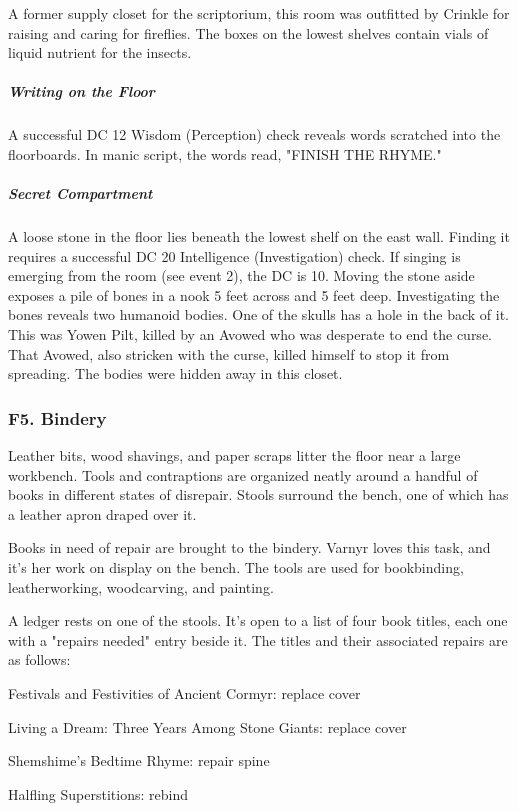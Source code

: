 \documentclass[10pt,a4paper,twoside,bg=print,twocolumn,openany,nodeprecatedcode]{dndbook}
\begin{document}
A former supply closet for the scriptorium, this room was outfitted by Crinkle for raising and caring for fireflies. The boxes on the lowest shelves contain vials of liquid nutrient for the insects.

\subparagraph{Writing on the Floor}
A successful DC 12 Wisdom (Perception) check reveals words scratched into the floorboards. In manic script, the words read, "FINISH THE RHYME."

\subparagraph{Secret Compartment}
A loose stone in the floor lies beneath the lowest shelf on the east wall. Finding it requires a successful DC 20 Intelligence (Investigation) check. If singing is emerging from the room (see event 2), the DC is 10. Moving the stone aside exposes a pile of bones in a nook 5 feet across and 5 feet deep. Investigating the bones reveals two humanoid bodies. One of the skulls has a hole in the back of it. This was Yowen Pilt, killed by an Avowed who was desperate to end the curse. That Avowed, also stricken with the curse, killed himself to stop it from spreading. The bodies were hidden away in this closet.

\subsubsection{F5. Bindery}
\begin{DndReadAloud}{}
Leather bits, wood shavings, and paper scraps litter the floor near a large workbench. Tools and contraptions are organized neatly around a handful of books in different states of disrepair. Stools surround the bench, one of which has a leather apron draped over it.

\end{DndReadAloud}

Books in need of repair are brought to the bindery. Varnyr loves this task, and it's her work on display on the bench. The tools are used for bookbinding, leatherworking, woodcarving, and painting.

A ledger rests on one of the stools. It's open to a list of four book titles, each one with a "repairs needed" entry beside it. The titles and their associated repairs are as follows:

Festivals and Festivities of Ancient Cormyr: replace cover

Living a Dream: Three Years Among Stone Giants: replace cover

Shemshime's Bedtime Rhyme: repair spine

Halfling Superstitions: rebind
\end{document}
